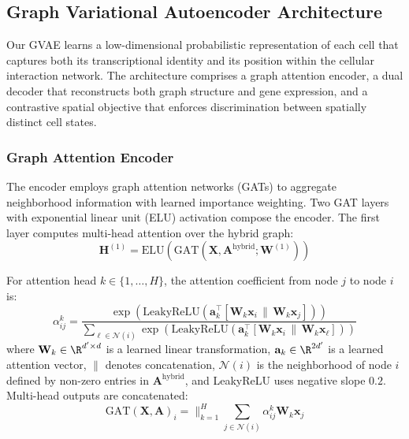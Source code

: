 \documentclass{article}
\begin{document}
\subsection{Graph Variational Autoencoder Architecture}

Our GVAE learns a low-dimensional probabilistic representation of each cell that captures both its transcriptional identity and its position within the cellular interaction network. The architecture comprises a graph attention encoder, a dual decoder that reconstructs both graph structure and gene expression, and a contrastive spatial objective that enforces discrimination between spatially distinct cell states.

\subsubsection{Graph Attention Encoder}

The encoder employs graph attention networks (GATs) \cite{velickovic2017graph} to aggregate neighborhood information with learned importance weighting. Two GAT layers with exponential linear unit (ELU) activation compose the encoder. The first layer computes multi-head attention over the hybrid graph:
\begin{equation}
    \mathbf{H}^{(1)} = \text{ELU}\!\left(\text{GAT}(\mathbf{X}, \mathbf{A}^{\text{hybrid}}; \mathbf{W}^{(1)})\right)
    \label{eq:gat_layer1}
\end{equation}

For attention head $k \in \{1, \ldots, H\}$, the attention coefficient from node $j$ to node $i$ is:
\begin{equation}
    \alpha^{k}_{ij} = \frac{
        \exp\!\left(\text{LeakyReLU}\!\left(\mathbf{a}_k^\top [\mathbf{W}_k \mathbf{x}_i \,\|\, \mathbf{W}_k \mathbf{x}_j]\right)\right)
    }{
        \sum_{\ell \in \mathcal{N}(i)} \exp\!\left(\text{LeakyReLU}\!\left(\mathbf{a}_k^\top [\mathbf{W}_k \mathbf{x}_i \,\|\, \mathbf{W}_k \mathbf{x}_\ell]\right)\right)
    }
    \label{eq:attention}
\end{equation}
where $\mathbf{W}_k \in \R^{d' \times d}$ is a learned linear transformation, $\mathbf{a}_k \in \R^{2d'}$ is a learned attention vector, $\|$ denotes concatenation, $\mathcal{N}(i)$ is the neighborhood of node $i$ defined by non-zero entries in $\mathbf{A}^{\text{hybrid}}$, and LeakyReLU uses negative slope $0.2$. Multi-head outputs are concatenated:
\begin{equation}
    \text{GAT}(\mathbf{X}, \mathbf{A})_i = \Big\|_{k=1}^{H} \sum_{j \in \mathcal{N}(i)} \alpha^k_{ij} \mathbf{W}_k \mathbf{x}_j
    \label{eq:multihead}
\end{equation}
\end{document}
